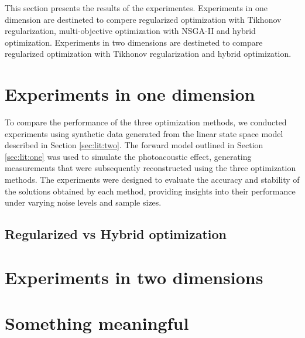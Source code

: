 
This section presents the results of the experimentes. Experiments in one dimension are destineted to compere regularized optimization with Tikhonov regularization, multi-objective optimization with NSGA-II and hybrid optimization. Experiments in two dimensions are destineted to compare regularized optimization with Tikhonov regularization and hybrid optimization.

\section{Experiments in one dimension}

To compare the performance of the three optimization methods, we conducted experiments using synthetic data generated from the linear state space model described in Section \ref{sec:lit:two}. The forward model outlined in Section \ref{sec:lit:one} was used to simulate the photoacoustic effect, generating measurements that were subsequently reconstructed using the three optimization methods. The experiments were designed to evaluate the accuracy and stability of the solutions obtained by each method, providing insights into their performance under varying noise levels and sample sizes.

\subsection{Regularized vs Hybrid optimization}

%

\section{Experiments in two dimensions}

%

\section{Something meaningful}


% 